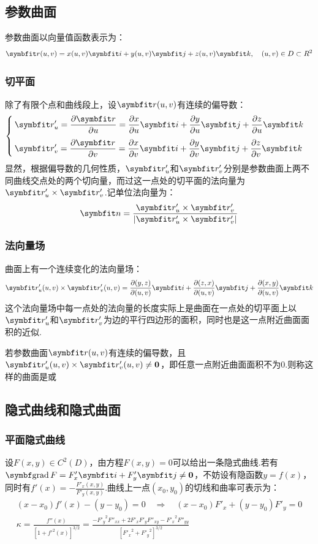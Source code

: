 \subsection{参数曲面}
参数曲面以向量值函数表示为：
\[\vb{r}(u,v) = x(u,v)\vb{i} + y(u,v)\vb{j} + z(u,v)\vb{k},\quad (u,v)\in D \subset\mathbb{R}^2\]
\subsubsection{切平面}
除了有限个点和曲线段上，设$\vb{r}(u,v)$有连续的偏导数：
\[\begin{cases}
    \displaystyle\vb{r}'_u = \pdv{\vb{r}}{u} = \pdv{x}{u}\vb{i} + \pdv{y}{u}\vb{j} + \pdv{z}{u}\vb{k} \\[1em]
    \displaystyle\vb{r}'_v = \pdv{\vb{r}}{v} = \pdv{x}{v}\vb{i} + \pdv{y}{v}\vb{j} + \pdv{z}{v}\vb{k} \\
\end{cases}\]
显然，根据偏导数的几何性质，$\vb{r}'_u$和$\vb{r}'_v$分别是参数曲面上两不同曲线交点处的两个切向量，而过这一点处的切平面的法向量为$\vb{r}'_u \times \vb{r}'_v$.记单位法向量为：
\[\vb{n} = \frac{\vb{r}'_u \times \vb{r}'_v}{|\vb{r}'_u \times \vb{r}'_v|}\]


\subsubsection{法向量场}
曲面上有一个连续变化的法向量场：
\[\vb{r}'_u(u,v) \times \vb{r}'_v(u,v) = \pdv{(y,z)}{(u,v)}\vb{i} + \pdv{(z,x)}{(u,v)}\vb{j} + \pdv{(x,y)}{(u,v)}\vb{k}\]
这个法向量场中每一点处的法向量的长度实际上是曲面在一点处的切平面上以$\vb{r}'_u$和$\vb{r}'_v$为边的平行四边形的面积，同时也是这一点附近曲面面积的近似.
\begin{definition}
    若参数曲面$\vb{r}(u,v)$有连续的偏导数，且$\vb{r}'_u(u,v) \times \vb{r}'_v(u,v) \neq \bm{0}$，即任意一点附近曲面面积不为$0$.则称这样的曲面是或
\end{definition}


\subsection{隐式曲线和隐式曲面}
\subsubsection{平面隐式曲线}
设$F(x,y) \in C^2(D)$，由方程$F(x,y) = 0$可以给出一条隐式曲线.若有$\grad F = F'_x\vb{i} + F'_y\vb{j} \neq \bm{0}$，不妨设有隐函数$y = f(x)$，同时有$f'(x) = -\frac{F'_x(x,y)}{F'_y(x,y)}$.曲线上一点$(x_0,y_0)$的切线和曲率可表示为：
\begin{gather*}
    (x-x_0)f'(x) - (y-y_0) = 0 \quad\Rightarrow\quad (x-x_0)F'_x + (y-y_0)F'_y = 0 \\
    \kappa = \frac{f''(x)}{\left[1+{f'}^2(x)\right]^{3/2}} = \frac{-{F'_y}^2 F''_{xx} + 2F'_x F'_y F''_{xy} - {F'_x}^2 F''_{yy}}{\left[{F'_x}^2 + {F'_y}^2\right]^{3/2}}
\end{gather*}

